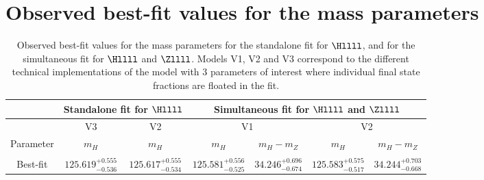 \section{Observed best-fit values for the mass parameters}

\begin{table}[htbp]
      \caption{
Observed best-fit values for the mass parameters for the standalone fit for $\Hllll$, and for the simultaneous fit for $\Hllll$ and $\Zllll$.
Models V1, V2 and V3 correspond to the different technical implementations of the model with 3 parameters of interest where individual final state fractions are floated in the fit.
 \label{tab:massesInclusive_results}
        }
\begin{tabular}{|c|c|c|c|c|c|c|}
\hline %
\hline %
 & \multicolumn{2}{|c|}{ Standalone fit for $\Hllll$} &  \multicolumn{4}{|c|}{ Simultaneous fit for $\Hllll$ and $\Zllll$} \\
\hline %
  & V3      & V2       &  \multicolumn{2}{|c|}{V1}   &  \multicolumn{2}{|c|}{V2} \\
\hline %
Parameter  & $m_{H}$ & $m_{H}$ & $m_{H}$ & $m_{H} - m_{Z}$  & $m_{H}$ & $m_{H} - m_{Z}$   \\
\hline %
\vspace{-0.4cm} &&&&&&\\
Best-fit
&$125.619^{+0.555}_{-0.536}$
&$125.617^{+0.555}_{-0.534}$
&$125.581^{+0.556}_{-0.525}$
&$34.246^{+0.696}_{-0.674}$
&$125.583^{+0.575}_{-0.517}$
&$34.244^{+0.703}_{-0.668}$
\\
\hline %
\hline %
\end{tabular}
\end{table}

